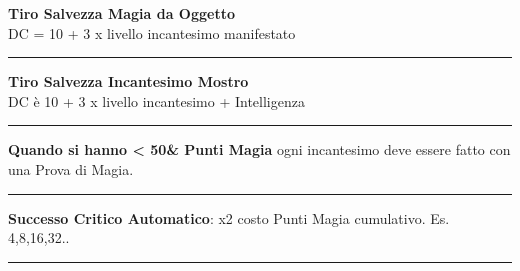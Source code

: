 \documentclass[a4paper,12 pt,openany]{book}
\newcommand{\riga}{\rule{\textwidth}{0.4pt}}
\begin{document}
\begin{textblock*}{5cm}
\textbf{Tiro Salvezza Magia da Oggetto}\\
DC = 10 + 3 x livello incantesimo manifestato

\riga

\textbf{Tiro Salvezza Incantesimo Mostro}\\
DC è 10 + 3 x livello incantesimo + Intelligenza

\riga

\textbf{Quando si hanno < 50\& Punti Magia} ogni incantesimo deve essere fatto con una Prova di Magia.

\riga

\textbf{Successo Critico Automatico}:  x2 costo Punti Magia cumulativo. Es. 4,8,16,32..

\riga

\end{textblock*}
\end{document}
